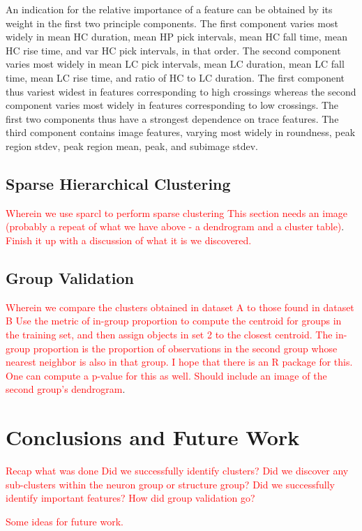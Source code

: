 \documentclass[10pt]{article}
\newcommand{\todo}[1]{\textcolor{red}{#1}}
\begin{document}
An indication for the relative importance of a feature can be obtained by its weight in the first two principle components.
The first component varies most widely in mean HC duration, mean HP pick intervals, mean HC fall time, mean HC rise time, and var HC pick intervals, in that order.
The second component varies most widely in mean LC pick intervals, mean LC duration, mean LC fall time, mean LC rise time, and ratio of HC to LC duration. 
The first component thus variest widest in features corresponding to high crossings whereas the second component varies most widely in features corresponding to low crossings.
The first two components thus have a strongest dependence on trace features.
The third component contains image features, varying most widely in roundness, peak region stdev, peak region mean, peak, and subimage stdev.

\subsection{Sparse Hierarchical Clustering}

\todo{Wherein we use sparcl to perform sparse clustering}
\todo{This section needs an image (probably a repeat of what we have above - a dendrogram and a cluster table)}.
\todo{Finish it up with a discussion of what it is we discovered.}

\subsection{Group Validation}

\todo{Wherein we compare the clusters obtained in dataset A to those found in dataset B}
\todo{Use the metric of in-group proportion to compute the centroid for groups in the training set, and then assign objects in set 2 to the closest centroid. The in-group proportion is the proportion of observations in the second group whose nearest neighbor is also in that group. I hope that there is an R package for this.}
\todo{One can compute a p-value for this as well.}
\todo{Should include an image of the second group's dendrogram}.

\section{Conclusions and Future Work}

\todo{Recap what was done}
\todo{Did we successfully identify clusters?}
\todo{Did we discover any sub-clusters within the neuron group or structure group?}
\todo{Did we successfully identify important features?}
\todo{How did group validation go?}

\todo{Some ideas for future work.}


\printbibliography
\end{document}

